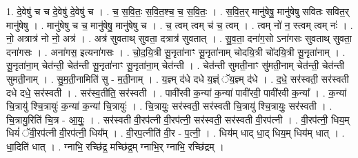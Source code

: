 \documentclass[17pt]{extarticle}
\begin{document}
1. दे॒वेषु॑ च च दे॒वेषु॑ दे॒वेषु॑ च । . च॒ स॒वि॒तः॒ स॒वि॒त॒श्च॒ च॒ स॒वि॒तः॒ । . स॒वि॒त॒र् मानु॑षेषु॒ मानु॑षेषु सवितः सवित॒र् मानु॑षेषु । . मानु॑षेषु च च॒ मानु॑षेषु॒ मानु॑षेषु च । . च॒ त्वम् त्वम् च॑ च॒ त्वम् । . त्वम् नो॑ न॒ स्त्वम् त्वम् नः॑ । . नो॒ अत्रात्र॑ नो नो॒ अत्र॑ । . अत्र॑ सुवताथ् सुवता॒ दत्रात्र॑ सुवतात् । . सु॒व॒ता॒ दना॑ग॒सो ऽना॑गसः सुवताथ् सुवता॒ दना॑गसः । . अना॑गस॒ इत्यना॑गसः । . चो॒द॒यि॒त्री सू॒नृता॑नाꣳ सू॒नृता॑नाम् चोदयि॒त्री चो॑दयि॒त्री सू॒नृता॑नाम् । . सू॒नृता॑ना॒म् चेत॑न्ती॒ चेत॑न्ती सू॒नृता॑नाꣳ सू॒नृता॑ना॒म् चेत॑न्ती । . चेत॑न्ती सुमती॒नाꣳ सु॑मती॒नाम् चेत॑न्ती॒ चेत॑न्ती सुमती॒नाम् । . सु॒म॒ती॒नामिति॑ सु - म॒ती॒नाम् । . य॒ज्ञ्म् द॑धे दधे य॒ज्ञ्ं ॅय॒ज्ञ्म् द॑धे । . द॒धे॒ सर॑स्वती॒ सर॑स्वती दधे दधे॒ सर॑स्वती । . सर॑स्व॒तीति॒ सर॑स्वती । . पावी॑रवी क॒न्या॑ क॒न्या॑ पावी॑रवी॒ पावी॑रवी क॒न्या᳚ । . क॒न्या॑ चि॒त्रायु॑ श्चि॒त्रायुः॑ क॒न्या॑ क॒न्या॑ चि॒त्रायुः॑ । . चि॒त्रायुः॒ सर॑स्वती॒ सर॑स्वती चि॒त्रायु॑ श्चि॒त्रायुः॒ सर॑स्वती । . चि॒त्रायु॒रिति॑ चि॒त्र - आ॒युः॒ । . सर॑स्वती वी॒रप॑त्नी वी॒रप॑त्नी॒ सर॑स्वती॒ सर॑स्वती वी॒रप॑त्नी । . वी॒रप॑त्नी॒ धिय॒म् धियं॑ ॅवी॒रप॑त्नी वी॒रप॑त्नी॒ धिय᳚म् । . वी॒रप॒त्नीति॑ वी॒र - प॒त्नी॒ । . धिय॑म् धाद् धा॒द् धिय॒म् धिय॑म् धात् । . धा॒दिति॑ धात् । . ग्नाभि॒ रच्छि॑द्र॒ मच्छि॑द्र॒म् ग्नाभि॒र् ग्नाभि॒ रच्छि॑द्रम् । \newline
\end{document}
